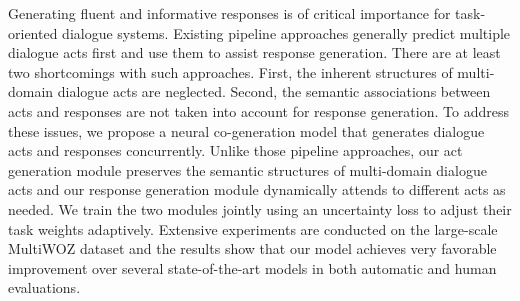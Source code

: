Generating fluent and informative responses is of critical importance for task-oriented dialogue systems. Existing pipeline approaches generally predict multiple dialogue acts first and use them to assist response generation. There are at least two shortcomings with such approaches. First, the inherent structures of multi-domain dialogue acts are neglected. Second, the semantic associations between acts and responses are not taken into account for response generation. To address these issues, we propose a neural co-generation model that generates dialogue acts and responses concurrently. Unlike those pipeline approaches, our act generation module preserves the semantic structures of multi-domain dialogue acts and our response generation module dynamically attends to different acts as needed. We train the two modules jointly using an uncertainty loss to adjust their task weights adaptively. Extensive experiments are conducted on the large-scale MultiWOZ dataset and the results show that our model achieves very favorable improvement over several state-of-the-art models in both automatic and human evaluations.
